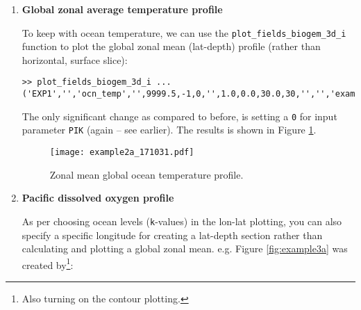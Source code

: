 \documentclass[11pt,fleqn]{book} %
\begin{document}
\begin{enumerate}[noitemsep]
\vspace{4pt}
Alternatively, using 3d plotting, you could plot the ocean surface temperature field as follows:

\footnotesize
\vspace{-0pt}\begin{verbatim}
>> plot_fields_biogem_3d_k ...
('EXP1','','ocn_temp','',9999.5,-1,16,'',1.0,0.0,30.0,30,'','','example1c');
\end{verbatim}\vspace{-0pt}
\normalsize
The main things that change here are firstly the variable name -- now \texttt{ocn\_temp}, and secondly because this is a 3D ocean field, we need to specify what ocean model level we want to plot -- this is where the integer \texttt{16} comes in and corresponds to the input  \texttt{PIK}, as discussed earlier. The resulting plot will be identical to Figure \ref{fig:example1a}.

\vspace{4pt}
\item \textbf{Global zonal average temperature profile}

To keep with ocean temperature, we can use the \texttt{plot\_fields\_biogem\_3d\_i} function to plot the global zonal mean (lat-depth) profile (rather than horizontal, surface slice):

\footnotesize
\vspace{-0pt}\begin{verbatim}
>> plot_fields_biogem_3d_i ...
('EXP1','','ocn_temp','',9999.5,-1,0,'',1.0,0.0,30.0,30,'','','example2a');
\end{verbatim}\vspace{-0pt}
\normalsize
The only significant change as compared to before, is setting a \texttt{0} for input parameter \texttt{PIK} (again -- see earlier). The results is shown in Figure \ref{fig:example2a}.

\begin{figure}[ht]
\begin{center}
\texttt{[image: example2a\_171031.pdf]}
\end{center}
\vspace{-4mm}
\caption{Zonal mean global ocean temperature profile.}
\label{fig:example2a}
\end{figure}

\vspace{4pt}
\item \textbf{Pacific dissolved oxygen profile}

As per choosing ocean levels (\texttt{k}-values) in the lon-lat plotting, you can also specify a specific longitude for creating a lat-depth section rather than calculating and plotting a global zonal mean. e.g. Figure \ref{fig:example3a} was created by\footnote{Also turning on the contour plotting.}:


\end{enumerate}
\end{document}
